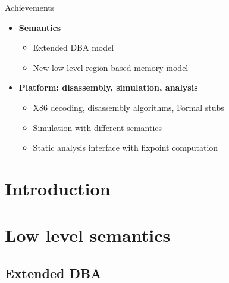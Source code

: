 \begin{frame}{Achievements}
      \begin{itemize}
      \item \textbf{Semantics}~
      \begin{itemize}
      \item Extended DBA model
      \item New low-level region-based memory model
      \end{itemize}
      \bigskip
      \item \textbf{Platform: disassembly, simulation, analysis}~
      \begin{itemize}
      \item X86 decoding, disassembly algorithms, Formal stubs
      \item Simulation with different semantics
      \item Static analysis interface with fixpoint computation
      \end{itemize}
      \end{itemize}
\end{frame}



\section{Introduction}
\section{Low level semantics}

\subsection{Extended DBA}

